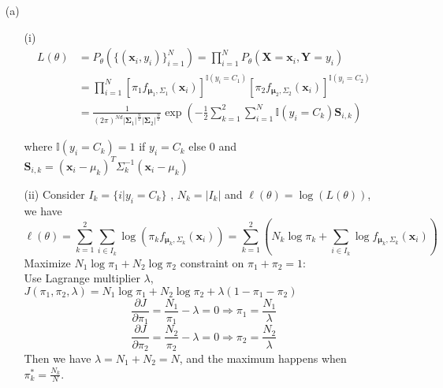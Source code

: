 \documentclass[12pt,a4paper]{article}
\begin{document}
\begin{enumerate}
    \item[(a)]
        \begin{enumerate}
            \item [(i)]
                \begin{align*}
                    L(\theta) 
                        &= P_{\theta}(\{(\mathbf{x}_{i}, y_{i})\}_{i=1}^{N}) = \prod_{i=1}^{N} P_{\theta}(\mathbf{X}=\mathbf{x}_{i}, \mathbf{Y}=y_{i})\\
                        &= \prod_{i=1}^{N} [\pi_{1}f_{\mathbf{\mu}_{1}, \Sigma_{1}}(\mathbf{x}_{i})]^{\mathbb{I} (y_{i}=C_{1})} [\pi_{2}f_{\mathbf{\mu}_{2}, \Sigma_{2}}(\mathbf{x}_{i})]^{\mathbb{I} (y_{i}=C_{2})}\\
                        &= \frac{1}{(2\pi)^{Nd} |\boldsymbol{\Sigma}_{1}|^{\frac{N}{2}} |\boldsymbol{\Sigma}_{2}|^{\frac{N}{2}}}\exp\left(-\frac{1}{2}\sum_{k=1}^{2}\sum_{i=1}^{N}\mathbb{I} (y_{i}=C_{k})\mathbf{S}_{i,k}\right)
                \end{align*}

                where $\mathbb{I} (y_{i}=C_{k}) = 1$ if $y_{i}=C_{k}$ else 0 and $\mathbf{S}_{i, k} = (\mathbf{x}_{i}-\mu_{k})^T\Sigma_{k}^{-1}(\mathbf{x}_{i}-\mu_{k})$
            \item [(ii)]
                Consider $I_{k} = \{i|y_{i}=C_{k}\}$ , $N_{k} = |I_{k}|$ and $\ell(\theta) = \log(L(\theta))$, we have
                \[
                    \ell(\theta) = \sum_{k=1}^{2}\sum_{i\in I_{k}}\log(\pi_{k}f_{\mathbf{\mu}_{k}, \Sigma_{k}}(\mathbf{x}_{i})) = \sum_{k=1}^{2}(N_{k}\log \pi_{k} + \sum_{i\in I_{k}}\log f_{\mathbf{\mu}_{k}, \Sigma_{k}}(\mathbf{x}_{i}))
                \]
                Maximize $N_{1}\log\pi_{1} + N_{2}\log\pi_{2}$ constraint on $\pi_{1} + \pi_{2} = 1$:\\
                Use Lagrange multiplier $\lambda$, $J(\pi_{1}, \pi_{2}, \lambda) = N_{1}\log\pi_{1} + N_{2}\log\pi_{2} + \lambda(1-\pi_{1}-\pi_{2})$
                \[
                    \frac{\partial J}{\partial \pi_{1}} = \frac{N_{1}}{\pi_{1}} - \lambda = 0 \Rightarrow \pi_{1} = \frac{N_{1}}{\lambda}
                \]
                \[
                    \frac{\partial J}{\partial \pi_{2}} = \frac{N_{2}}{\pi_{2}} - \lambda = 0 \Rightarrow \pi_{2} = \frac{N_{2}}{\lambda}
                \]
                Then we have $\lambda = N_{1} + N_{2} = N$, and the maximum happens when $\pi_{k}^{*} = \frac{N_{k}}{N}$.


\end{enumerate}
\end{enumerate}
\end{document}
